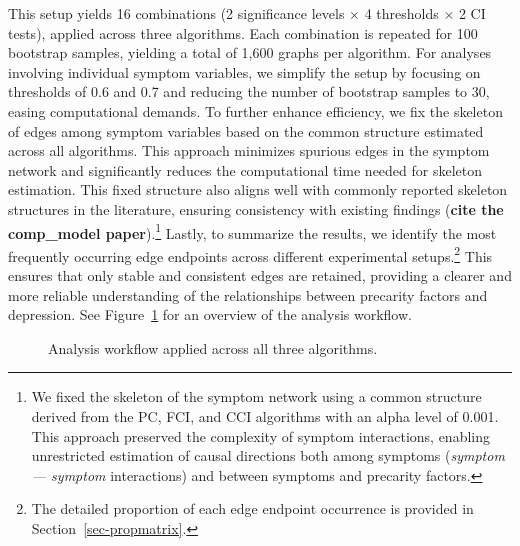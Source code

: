 \documentclass[
]{article}
\begin{document}
This setup yields 16 combinations (2 significance levels × 4 thresholds
× 2 CI tests), applied across three algorithms. Each combination is
repeated for 100 bootstrap samples, yielding a total of 1,600 graphs per
algorithm. For analyses involving individual symptom variables, we
simplify the setup by focusing on thresholds of 0.6 and 0.7 and reducing
the number of bootstrap samples to 30, easing computational demands. To
further enhance efficiency, we fix the skeleton of edges among symptom
variables based on the common structure estimated across all algorithms.
This approach minimizes spurious edges in the symptom network and
significantly reduces the computational time needed for skeleton
estimation. This fixed structure also aligns well with commonly reported
skeleton structures in the literature, ensuring consistency with
existing findings (\textbf{cite the comp\_model paper}).\footnote{We
  fixed the skeleton of the symptom network using a common structure
  derived from the PC, FCI, and CCI algorithms with an alpha level of
  0.001. This approach preserved the complexity of symptom interactions,
  enabling unrestricted estimation of causal directions both among
  symptoms (\emph{symptom --- symptom} interactions) and between
  symptoms and precarity factors.} Lastly, to summarize the results, we
identify the most frequently occurring edge endpoints across different
experimental setups.\footnote{The detailed proportion of each edge
  endpoint occurrence is provided in Section~\ref{sec-propmatrix}.} This
ensures that only stable and consistent edges are retained, providing a
clearer and more reliable understanding of the relationships between
precarity factors and depression. See Figure~\ref{fig-workflow} for an
overview of the analysis workflow.

\begin{figure}


\caption{\label{fig-workflow}Analysis workflow applied across all three
algorithms.}

\end{figure}%
\end{document}
